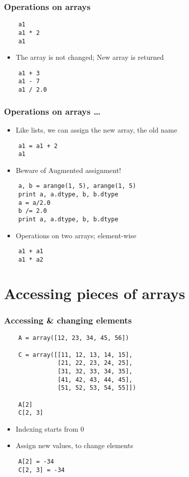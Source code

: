 \begin{frame}[fragile]
  \frametitle{Operations on arrays}
  \begin{lstlisting}
    a1
    a1 * 2
    a1
  \end{lstlisting}
  \begin{itemize}
  \item The array is not changed; New array is returned
  \end{itemize}
  \begin{lstlisting}
    a1 + 3
    a1 - 7
    a1 / 2.0
  \end{lstlisting}
\end{frame}

\begin{frame}[fragile]
  \frametitle{Operations on arrays \ldots}
  \begin{itemize}
  \item Like lists, we can assign the new array, the old name
  \end{itemize}
  \begin{lstlisting}
    a1 = a1 + 2
    a1
  \end{lstlisting}
  \begin{itemize}
   \item \alert{Beware of Augmented assignment!}
  \end{itemize}
  \begin{lstlisting}
    a, b = arange(1, 5), arange(1, 5)
    print a, a.dtype, b, b.dtype
    a = a/2.0
    b /= 2.0
    print a, a.dtype, b, b.dtype
  \end{lstlisting}
  \begin{itemize}
  \item Operations on two arrays; element-wise
  \end{itemize}
  \begin{lstlisting}
    a1 + a1
    a1 * a2
  \end{lstlisting}
\end{frame}

\section{Accessing pieces of arrays}

\begin{frame}[fragile]
  \frametitle{Accessing \& changing elements}
  \begin{lstlisting}
    A = array([12, 23, 34, 45, 56])

    C = array([[11, 12, 13, 14, 15],
               [21, 22, 23, 24, 25],
               [31, 32, 33, 34, 35],
               [41, 42, 43, 44, 45],
               [51, 52, 53, 54, 55]])

    A[2]
    C[2, 3]
  \end{lstlisting}
  \begin{itemize}
  \item Indexing starts from 0
  \item Assign new values, to change elements
  \end{itemize}
  \begin{lstlisting}
    A[2] = -34
    C[2, 3] = -34
  \end{lstlisting}
\end{frame}

